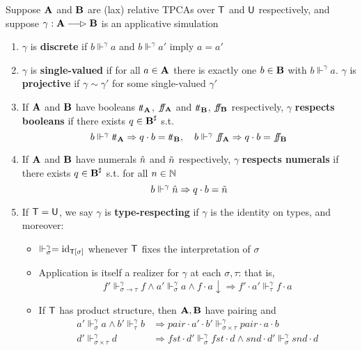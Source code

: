 \documentclass[11pt]{article}
\newcommand{\FF}{f\mspace{-7mu}f}
\newcommand{\TT}{t\mspace{-3mu}t}
\begin{document}
\begin{definition}[]
Suppose \(\operatorname{\textbf{A}}\) and \(\operatorname{\textbf{B}}\) are (lax) relative TPCAs over \(\textsf{T}\) and \(\textsf{U}\) respectively, and
suppose \(\gamma:\bA\lrarhd\bB\) is an applicative simulation
\begin{enumerate}
\item \(\gamma\) is \textbf{discrete} if \(b\Vdash^\gamma a\) and \(b\Vdash^\gamma a'\) imply \(a=a'\)
\item \(\gamma\) is \textbf{single-valued} if for all \(a\in\operatorname{\textbf{A}}\) there is exactly one \(b\in\operatorname{\textbf{B}}\) with \(b\Vdash^\gamma a\). \(\gamma\) is
\textbf{projective} if \(\gamma\sim\gamma'\) for some single-valued \(\gamma'\)
\item If \(\operatorname{\textbf{A}}\) and \(\operatorname{\textbf{B}}\) have booleans \(\TT_{\bA}\), \(\FF_{\bA}\) and \(\TT_{\bB}\), \(\FF_{\bB}\)
respectively, \(\gamma\) \textbf{respects booleans} if there exists \(q\in\operatorname{\textbf{B}}^\sharp\) s.t.
\begin{equation*}
b\Vdash^\gamma\TT_{\bA}\Rightarrow q\cdot b=\TT_{\bB},\quad b\Vdash^\gamma\FF_{\bA}\Rightarrow q\cdot b=\FF_{\bB}
\end{equation*}
\item If \(\operatorname{\textbf{A}}\) and \(\operatorname{\textbf{B}}\) have numerals \(\hat{n}\) and \(\tilde{n}\) respectively, \(\gamma\) \textbf{respects numerals} if
there exists \(q\in\operatorname{\textbf{B}}^\sharp\) s.t. for all \(n\in\mathbb{N}\)
\begin{equation*}
b\Vdash^\gamma\hat{n}\Rightarrow q\cdot b=\tilde{n}
\end{equation*}
\item If \(\textsf{T}=\textsf{U}\), we say \(\gamma\) is \textbf{type-respecting} if \(\gamma\) is the identity on types, and moreover:
\begin{itemize}
\item \(\Vdash_\sigma^\gamma=\operatorname{id}_{\textsf{T}[\sigma]}\) whenever \(\textsf{T}\) fixes the interpretation of \(\sigma\)
\item Application is itself a realizer for \(\gamma\) at each \(\sigma,\tau\): that is,
\begin{equation*}
f'\Vdash_{\sigma\to\tau}^\gamma f\wedge a'\Vdash_\sigma^\gamma a\wedge f\cdot a\downarrow\Rightarrow f'\cdot a'\Vdash_\tau^\gamma f\cdot a
\end{equation*}
\item If \(\textsf{T}\) has product structure, then \(\operatorname{\textbf{A}},\operatorname{\textbf{B}}\) have pairing and
\begin{align*}
a'\Vdash_\sigma^\gamma a\wedge b'\Vdash_\tau^\gamma b&\Rightarrow pair\cdot a'\cdot b'\Vdash_{\sigma\times\tau}^\gamma pair\cdot a\cdot b\\
d'\Vdash_{\sigma\times\tau}^\gamma d&\Rightarrow fst\cdot d'\Vdash_\sigma^\gamma fst\cdot d\wedge snd\cdot d'\Vdash_\sigma^\gamma snd\cdot d
\end{align*}
\end{itemize}
\end{enumerate}
\end{definition}
\end{document}
